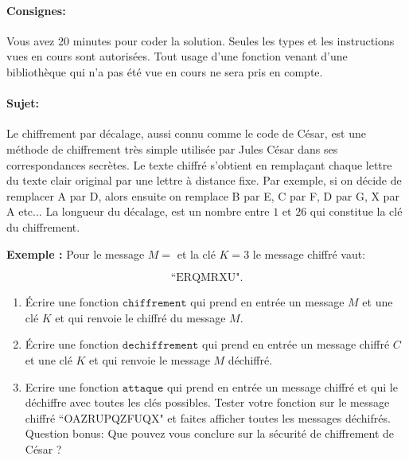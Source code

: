 \documentclass[a4paper,11pt]{article}
\begin{document}
\paragraph*{Consignes:} Vous avez 20 minutes pour coder la solution. Seules les types et les instructions vues en cours sont autorisées. Tout usage d'une fonction 
venant d'une bibliothèque qui n'a pas été vue en cours ne sera pris en compte. 

\vspace{-0.2 cm}
\paragraph*{Sujet:}

Le chiffrement par décalage, aussi connu comme le code de César, est une méthode de chiffrement très simple utilisée par Jules César dans ses correspondances secrètes. Le texte chiffré s'obtient en remplaçant chaque lettre du texte clair original par une lettre à distance fixe. Par exemple, si on décide de remplacer A par D, alors ensuite on remplace B par E, C par F, D par G, X par A etc... La longueur du décalage, est un nombre entre $1$ et $26$ qui constitue la clé du chiffrement.

\vspace{0.2 cm}
\textbf{Exemple :}  
Pour le message $M=$  et la clé $K=3$ le message chiffré vaut:  
\vspace{-0.2 cm}

\[
	\text{``ERQMRXU"}.
\]

\begin{enumerate}
  \item[1.] Écrire une fonction $\texttt{chiffrement}$ qui prend en entrée un message $M$ et une clé $K$ et qui renvoie le chiffré du message $M$.
 \item[2.] Écrire une fonction $\texttt{dechiffrement}$ qui prend en entrée un message chiffré $C$ et une clé $K$ et qui renvoie le message $M$ déchiffré.
 \item[3.] Ecrire une fonction $\texttt{attaque}$ qui prend en entrée un message chiffré et qui le déchiffre avec toutes les clés possibles. Tester votre fonction sur le message chiffré ``OAZRUPQZFUQX" et faites afficher toutes les messages déchifrés. \\
 
 
 Question bonus: Que pouvez vous conclure sur la sécurité de chiffrement de César ? 
 \end{enumerate}
 \vspace{-0.2 cm}
\end{document}
